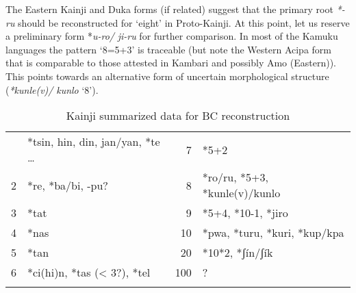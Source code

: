 The Eastern Kainji and Duka forms (if related) suggest that the primary root \textit{*-ru} should be reconstructed for ‘eight’ in Proto-Kainji. At this point, let us reserve a preliminary form *\textit{u-ro/} \textit{ji-ru} for further comparison. In most of the Kamuku languages the pattern ‘8=5+3’ is traceable (but note the Western Acipa form that is comparable to those attested in Kambari and possibly Amo (Eastern)). This points towards an alternative form of uncertain morphological structure (\textit{*kunle(v)/} \textit{kunlo} ‘8’).
  
\newpage   
{}\label{sec:3.1.2.7.6}

\begin{table}[b]
\caption{\label{tab:3:41}Kainji {summarized data for BC reconstruction}}
\begin{tabularx}{\textwidth}{rXrl}
\lsptoprule
1 & *tsin, hin, din, jan/yan, *te … & 7 & *5+2\\
2 & *re, *ba/bi, -pu? & 8 & *ro/ru, *5+3, *kunle(v)/kunlo\\
3 & *tat & 9 & *5+4, *10-1, *jiro\\
4 & *nas & 10 & *pwa, *turu, *kuri, *kup/kpa\\
5 & *tan & 20 & *10*2, *ʃín/ʃík\\
6 & *ci(hi)n, *tas (< 3?), *tel & 100 & ?\\
\lspbottomrule
\end{tabularx}
\end{table}


